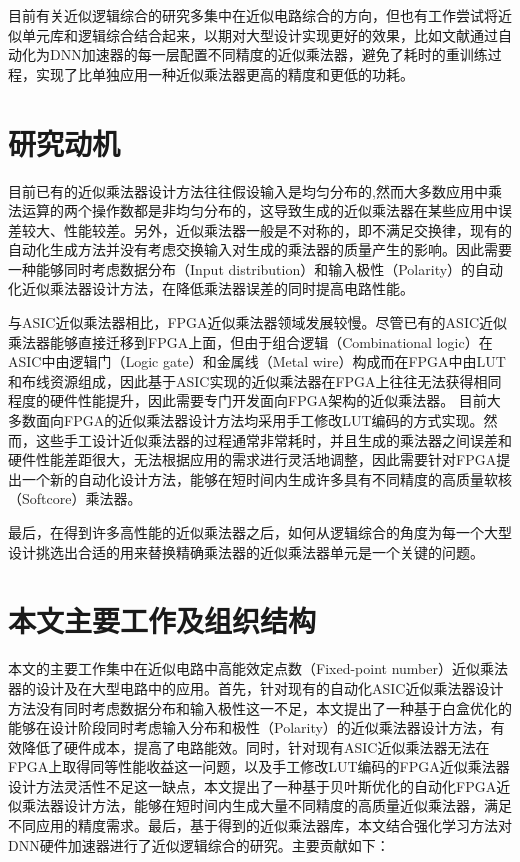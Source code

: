 

目前有关近似逻辑综合的研究多集中在近似电路综合的方向\cite{AC:ALS:ALSRAC}，但也有工作尝试将近似单元库和逻辑综合结合起来，以期对大型设计实现更好的效果，比如文献\cite{Accelerator:ALWANN}通过自动化为DNN加速器的每一层配置不同精度的近似乘法器，避免了耗时的重训练过程，实现了比单独应用一种近似乘法器更高的精度和更低的功耗。



\section{研究动机}


目前已有的近似乘法器设计方法往往假设输入是均匀分布的,然而大多数应用中乘法运算的两个操作数都是非均匀分布的，这导致生成的近似乘法器在某些应用中误差较大、性能较差。另外，近似乘法器一般是不对称的，即不满足交换律，现有的自动化生成方法并没有考虑交换输入对生成的乘法器的质量产生的影响。因此需要一种能够同时考虑数据分布（Input distribution）和输入极性（Polarity）的自动化近似乘法器设计方法，在降低乘法器误差的同时提高电路性能。

与ASIC近似乘法器相比，FPGA近似乘法器领域发展较慢。尽管已有的ASIC近似乘法器能够直接迁移到FPGA上面，但由于组合逻辑（Combinational logic）在ASIC中由逻辑门（Logic gate）和金属线（Metal wire）构成而在FPGA中由LUT和布线资源组成，因此基于ASIC实现的近似乘法器在FPGA上往往无法获得相同程度的硬件性能提升，因此需要专门开发面向FPGA架构的近似乘法器。
目前大多数面向FPGA的近似乘法器设计方法均采用手工修改LUT编码的方式实现。然而，这些手工设计近似乘法器的过程通常非常耗时，并且生成的乘法器之间误差和硬件性能差距很大，无法根据应用的需求进行灵活地调整，因此需要针对FPGA提出一个新的自动化设计方法，能够在短时间内生成许多具有不同精度的高质量软核（Softcore）乘法器。

最后，在得到许多高性能的近似乘法器之后，如何从逻辑综合的角度为每一个大型设计挑选出合适的用来替换精确乘法器的近似乘法器单元是一个关键的问题。


\section{本文主要工作及组织结构}

本文的主要工作集中在近似电路中高能效定点数（Fixed-point number）近似乘法器的设计及在大型电路中的应用。首先，针对现有的自动化ASIC近似乘法器设计方法没有同时考虑数据分布和输入极性这一不足，本文提出了一种基于白盒优化的能够在设计阶段同时考虑输入分布和极性（Polarity）的近似乘法器设计方法，有效降低了硬件成本，提高了电路能效。同时，针对现有ASIC近似乘法器无法在FPGA上取得同等性能收益这一问题，以及手工修改LUT编码的FPGA近似乘法器设计方法灵活性不足这一缺点，本文提出了一种基于贝叶斯优化的自动化FPGA近似乘法器设计方法，能够在短时间内生成大量不同精度的高质量近似乘法器，满足不同应用的精度需求。最后，基于得到的近似乘法器库，本文结合强化学习方法对DNN硬件加速器进行了近似逻辑综合的研究。主要贡献如下：

